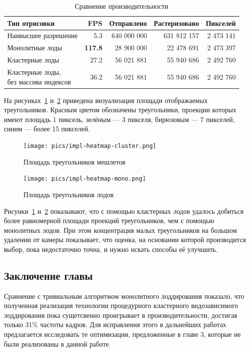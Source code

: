 \begin{table}[h]
    \centering
    \begin{tabular}{lrrrr}
        \hline \hline
        Тип отрисовки
        & FPS
        & Отправлено
        & Растеризовано
        & Пикселей \\ \hline
        Наивысшее разрешение
        & 5.3
        & 640 000 000
        & 631 812 157
        & 2 473 141 \\
        Монолитные лоды
        & \textbf{117.8}
        & 28 900 000
        & 22 478 691
        & 2 473 397 \\
        Кластерные лоды
        & 27.2
        & 56 021 881
        & 55 940 686
        & 2 492 760 \\
        \makecell[l]{Кластерные лоды,\\ без массива индексов}
        & 36.2
        & 56 021 881
        & 55 940 686
        & 2 492 760 \\
        \hline \hline
    \end{tabular}

    \caption{Сравнение производительности}
    \label{tab:fps}
\end{table}

На рисунках~\ref{fig:impl-heatmap-cluster} и~\ref{fig:impl-heatmap-mono} приведена визуализация площади отображаемых треугольников.
Красным цветом обозначены треугольники, проекции которых имеют площадь 1 пиксель, зелёным --- 3 пикселя, бирюзовым --- 7 пикселей, синим --- более 15 пикселей.

\begin{figure}[H]
    \texttt{[image: pics/impl-heatmap-cluster.png]}
    \caption{Площадь треугольников мешлетов}
    \label{fig:impl-heatmap-cluster}
\end{figure}

\begin{figure}[H]
    \texttt{[image: pics/impl-heatmap-mono.png]}
    \caption{Площадь треугольников лодов}
    \label{fig:impl-heatmap-mono}
\end{figure}

Рисунки~\ref{fig:impl-heatmap-cluster} и~\ref{fig:impl-heatmap-mono} показывают, что с помощью кластерных лодов удалось добиться более равномерной площади проекций треугольников, чем с помощью монолитных лодов.
При этом концентрация малых треугольников на большом удалении от камеры показывает, что оценка, на основании которой производится выбор, пока недостаточно точна, и нужно искать способы её улучшить.

\subsection*{Заключение главы}
Сравнение с тривиальным алгоритмом монолитного лоддирования показало, что полученная реализация технологии процедурного кластерного видозависимого лоддирования пока сущетсвенно проигрывает в производительности, достигая только 31\% частоты кадров.
Для исправления этого в дальнейших работах предлагается исследовать те оптимизации, предложенные в главе 3, которые не были реализованы в данной работе.
